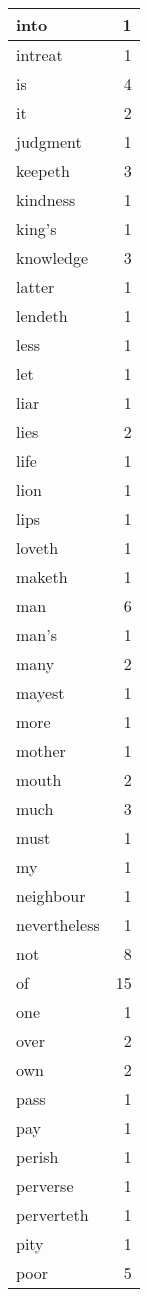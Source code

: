 \begin{center}
\begin{longtable}{l|r}
into & 1\\ \hline 
intreat & 1\\ \hline 
is & 4\\ \hline 
it & 2\\ \hline 
judgment & 1\\ \hline 
keepeth & 3\\ \hline 
kindness & 1\\ \hline 
king's & 1\\ \hline 
knowledge & 3\\ \hline 
latter & 1\\ \hline 
lendeth & 1\\ \hline 
less & 1\\ \hline 
let & 1\\ \hline 
liar & 1\\ \hline 
lies & 2\\ \hline 
life & 1\\ \hline 
lion & 1\\ \hline 
lips & 1\\ \hline 
loveth & 1\\ \hline 
maketh & 1\\ \hline 
man & 6\\ \hline 
man's & 1\\ \hline 
many & 2\\ \hline 
mayest & 1\\ \hline 
more & 1\\ \hline 
mother & 1\\ \hline 
mouth & 2\\ \hline 
much & 3\\ \hline 
must & 1\\ \hline 
my & 1\\ \hline 
neighbour & 1\\ \hline 
nevertheless & 1\\ \hline 
not & 8\\ \hline 
of & 15\\ \hline 
one & 1\\ \hline 
over & 2\\ \hline 
own & 2\\ \hline 
pass & 1\\ \hline 
pay & 1\\ \hline 
perish & 1\\ \hline 
perverse & 1\\ \hline 
perverteth & 1\\ \hline 
pity & 1\\ \hline 
poor & 5\\ \hline 

\end{longtable}
\end{center}
